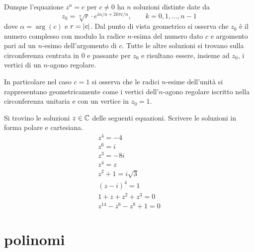Dunque l'equazione $z^n = c$ per $c\neq 0$ ha $n$ soluzioni distinte date
da
\[
z_k = \sqrt[n]{r} \cdot e^{i\alpha/n + 2k\pi i /n},
\qquad k=0,1, \dots, n-1
\]
dove $\alpha = \arg(c)$ e $r = {\left|c\right|}$.
Dal punto di vista geometrico si osserva che
$z_0$ è il numero complesso con modulo la radice $n$-esima del numero
dato $c$ e argomento pari ad un $n$-esimo dell'argomento di $c$.
Tutte le altre soluzioni si trovano sulla circonferenza centrata in $0$
e passante per $z_0$ e risultano essere, insieme ad $z_0$, i vertici
di un $n$-agono regolare.

In particolare nel caso $c=1$ si osserva che le radici $n$-esime dell'unità
si rappresentano geometricamente come i vertici dell'$n$-agono regolare iscritto
nella circonferenza unitaria e con un vertice in $z_0=1$.

\begin{exercise}
Si trovino le soluzioni $z \in \mathbb C$ delle seguenti equazioni.
Scrivere le soluzioni in forma polare e cartesiana.
\begin{gather*}
   z^4 = -4 \\
   z^6 = i\\
   z^3 = -8i \\
   z^4 = z\\
   z^2 + 1 = i\sqrt{3} \\
   (z-i)^4 = 1\\
   1 + z + z^2 + z^3 = 0\\
   z^{14} - z^6 - z^8 + 1 = 0
\end{gather*}
\end{exercise}

\section{polinomi}


